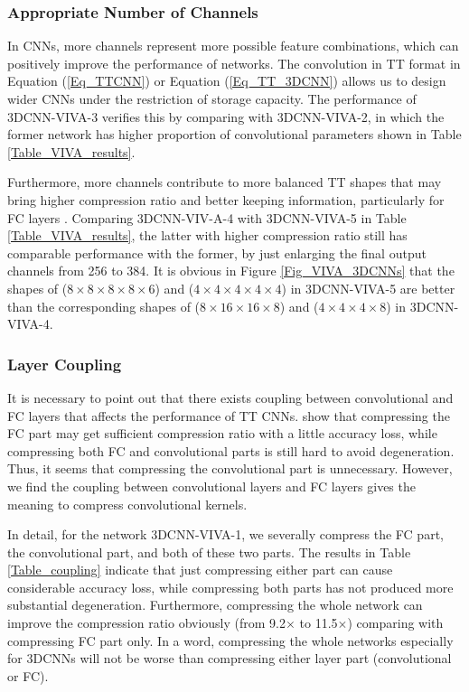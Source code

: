 \documentclass[a4paper,fleqn]{cas-dc}
\begin{document}
\subsubsection{Appropriate Number of Channels}\quad

In CNNs, more channels represent more possible feature combinations, which can positively improve the performance of networks. The convolution in TT format in  Equation (\ref{Eq_TTCNN}) or Equation (\ref{Eq_TT_3DCNN}) allows us to design wider CNNs under the restriction of storage capacity. The performance of 3DCNN-VIVA-3 verifies this by comparing with 3DCNN-VIVA-2, in which the former network has higher proportion of convolutional parameters shown in Table \ref{Table_VIVA_results}.

Furthermore, more channels contribute to more balanced TT shapes that may bring higher compression ratio and better keeping information, particularly for FC layers \citep{Novikov_2015_TT}. Comparing 3DCNN-VIV-A-4 with 3DCNN-VIVA-5 in Table \ref{Table_VIVA_results}, the latter with higher compression ratio still has comparable performance with the former, by just enlarging the final output channels from 256 to 384. It is obvious in Figure \ref{Fig_VIVA_3DCNNs} that the shapes of (\(8 \times 8 \times 8 \times 8 \times 6\)) and (\(4 \times 4 \times 4 \times 4 \times 4\)) in 3DCNN-VIVA-5 are better than the corresponding shapes of (\(8 \times 16 \times 16 \times 8\)) and (\(4 \times 4 \times 4 \times 8\)) in 3DCNN-VIVA-4.

\subsubsection{Layer Coupling}\quad

It is necessary to point out that there exists coupling between convolutional and FC layers that affects the performance of TT CNNs. \citet{Novikov_2015_TT,Garipov_2016_TTCNN} show that compressing the FC part may get sufficient compression ratio with a little accuracy loss, while compressing both FC and convolutional parts is still hard to avoid degeneration. Thus, it seems that compressing the convolutional part is unnecessary. However, we find the coupling between convolutional layers and FC layers gives the meaning to compress convolutional kernels.

In detail, for the network 3DCNN-VIVA-1, we severally compress the FC part, the convolutional part, and both of these two parts. The results in Table \ref{Table_coupling} indicate that just compressing either part can cause considerable accuracy loss, while compressing both parts has not produced more substantial degeneration. Furthermore, compressing the whole network can improve the compression ratio obviously (from 9.2\(\times\) to 11.5\(\times\)) comparing with compressing FC part only. In a word, compressing the whole networks especially for 3DCNNs will not be worse than compressing either layer part (convolutional or FC).
\end{document}
